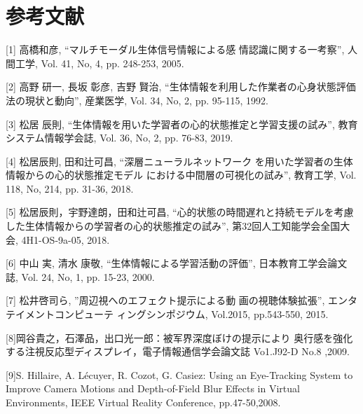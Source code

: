\chapter*{参考文献}
[1] 高橋和彦, “マルチモーダル生体信号情報による感 情認識に関する一考察”, 人間工学, Vol. 41, No, 4, pp. 248-253, 2005.

[2] 高野 研一, 長坂 彰彦, 吉野 賢治, “生体情報を利用した作業者の心身状態評価法の現状と動向”, 産業医学, Vol. 34, No, 2, pp. 95-115, 1992.
 
[3] 松居 辰則, “生体情報を用いた学習者の心的状態推定と学習支援の試み”, 教育システム情報学会誌, Vol. 36, No, 2, pp. 76-83, 2019.
 
[4] 松居辰則, 田和辻可昌, “深層ニューラルネットワーク を用いた学習者の生体情報からの心的状態推定モデル における中間層の可視化の試み”, 教育工学, Vol. 118, No, 214, pp. 31-36, 2018.
 
[5] 松居辰則，宇野達朗，田和辻可昌, “心的状態の時間遅れと持続モデルを考慮した生体情報からの学習者の心的状態推定の試み”, 第32回人工知能学会全国大会, 4H1-OS-9a-05, 2018.
 
[6] 中山 実, 清水 康敬, “生体情報による学習活動の評価”, 日本教育工学会論文誌, Vol. 24, No, 1, pp. 15-23, 2000.

[7] 松井啓司ら, ”周辺視へのエフェクト提示による動 画の視聴体験拡張”, エンタテイメントコンピューテ ィングシンポジウム, Vol.2015, pp.543-550, 2015. 
		
[8]岡谷貴之，石澤品，出口光一郎：被军界深度ぼけの提示により 奥行感を強化する注視反応型ディスプレイ，電子情報通信学会論文誌 Vo1.J92-D No.8 ,2009.

[9]S. Hillaire, A. Lécuyer, R. Cozot, G. Casiez: Using an Eye-Tracking System to Improve Camera Motions and Depth-of-Field Blur Effects in Virtual Environments, IEEE Virtual Reality Conference, pp.47-50,2008.


